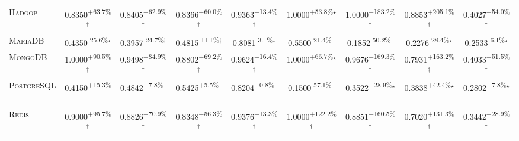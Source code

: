 \begin{table}[htbp]
\begin{tabular}{l|cccc|cccc}
\textsc{Hadoop} & \cellcolor{green!30}0.8350\textsuperscript{+63.7\%}$^\dagger$ & \cellcolor{green!30}0.8405\textsuperscript{+62.9\%}$^\dagger$ & \cellcolor{green!30}0.8366\textsuperscript{+60.0\%}$^\dagger$ & \cellcolor{green!30}0.9363\textsuperscript{+13.4\%}$^\dagger$ & \cellcolor{green!30}1.0000\textsuperscript{+53.8\%}$^\star$ & \cellcolor{green!30}1.0000\textsuperscript{+183.2\%}$^\dagger$ & \cellcolor{green!30}0.8853\textsuperscript{+205.1\%}$^\dagger$ & \cellcolor{green!30}0.4027\textsuperscript{+54.0\%}$^\dagger$ \\
\textsc{MariaDB} & \cellcolor{red!30}0.4350\textsuperscript{-25.6\%}$^\star$ & \cellcolor{red!30}0.3957\textsuperscript{-24.7\%}$^\dagger$ & \cellcolor{red!30}0.4815\textsuperscript{-11.1\%}$^\dagger$ & \cellcolor{red!30}0.8081\textsuperscript{-3.1\%}$^\star$ & \cellcolor{red!30}0.5500\textsuperscript{-21.4\%}$^{\,\,\,}$ & \cellcolor{red!30}0.1852\textsuperscript{-50.2\%}$^\dagger$ & \cellcolor{red!30}0.2276\textsuperscript{-28.4\%}$^\star$ & \cellcolor{red!30}0.2533\textsuperscript{-6.1\%}$^\star$ \\
\textsc{MongoDB} & \cellcolor{green!30}1.0000\textsuperscript{+90.5\%}$^\dagger$ & \cellcolor{green!30}0.9498\textsuperscript{+84.9\%}$^\dagger$ & \cellcolor{green!30}0.8802\textsuperscript{+69.2\%}$^\dagger$ & \cellcolor{green!30}0.9624\textsuperscript{+16.4\%}$^\dagger$ & \cellcolor{green!30}1.0000\textsuperscript{+66.7\%}$^\star$ & \cellcolor{green!30}0.9676\textsuperscript{+169.3\%}$^\dagger$ & \cellcolor{green!30}0.7931\textsuperscript{+163.2\%}$^\dagger$ & \cellcolor{green!30}0.4033\textsuperscript{+51.5\%}$^\dagger$ \\
\textsc{PostgreSQL} & \cellcolor{green!30}0.4150\textsuperscript{+15.3\%}$^{\,\,\,}$ & \cellcolor{green!30}0.4842\textsuperscript{+7.8\%}$^{\,\,\,}$ & \cellcolor{green!30}0.5425\textsuperscript{+5.5\%}$^{\,\,\,}$ & \cellcolor{green!30}0.8204\textsuperscript{+0.8\%}$^{\,\,\,}$ & \cellcolor{red!30}0.1500\textsuperscript{-57.1\%}$^{\,\,\,}$ & \cellcolor{green!30}0.3522\textsuperscript{+28.9\%}$^\star$ & \cellcolor{green!30}0.3838\textsuperscript{+42.4\%}$^\star$ & \cellcolor{green!30}0.2802\textsuperscript{+7.8\%}$^\star$ \\
\textsc{Redis} & \cellcolor{green!30}0.9000\textsuperscript{+95.7\%}$^\dagger$ & \cellcolor{green!30}0.8826\textsuperscript{+70.9\%}$^\dagger$ & \cellcolor{green!30}0.8348\textsuperscript{+56.3\%}$^\dagger$ & \cellcolor{green!30}0.9376\textsuperscript{+13.3\%}$^\dagger$ & \cellcolor{green!30}1.0000\textsuperscript{+122.2\%}$^\dagger$ & \cellcolor{green!30}0.8851\textsuperscript{+160.5\%}$^\dagger$ & \cellcolor{green!30}0.7020\textsuperscript{+131.3\%}$^\dagger$ & \cellcolor{green!30}0.3442\textsuperscript{+28.9\%}$^\dagger$ \\

\end{tabular}
\end{table}
